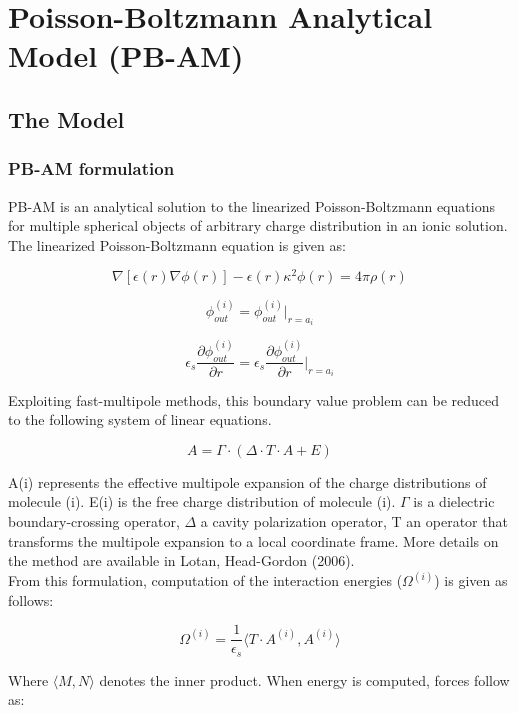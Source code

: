 
\chapter{Poisson-Boltzmann Analytical Model (PB-AM)}



\section{The Model}



\subsection{PB-AM formulation}

PB-AM is an analytical solution to the linearized Poisson-Boltzmann equations for multiple spherical objects of arbitrary charge distribution in an ionic solution.  The linearized Poisson-Boltzmann equation is given as:

\[ \nabla [\epsilon(r) \nabla\phi(r)] - \epsilon(r) \kappa^2\phi(r) = 4 \pi \rho(r) \] %

\[ \phi_{out}^{(i)}= \phi_{out}^{(i)} \biggr |_{r=a_i } \]

\[\epsilon_s \frac{\partial \phi_{out}^{(i)}}{\partial r} =   \epsilon_s \frac{\partial \phi_{out}^{(i)}}{\partial r} \biggr |_{r=a_i } \]

Exploiting fast-multipole methods, this boundary value problem can be reduced to the following system of linear equations.  

\[ A = \Gamma \cdot (\Delta \cdot T \cdot A + E) \]

A(i) represents the effective multipole expansion of the charge distributions of molecule (i). E(i) is the free charge distribution of molecule (i). $\Gamma$ is a dielectric boundary-crossing operator, $\Delta$ a cavity polarization operator, T an operator that transforms the multipole expansion to a local coordinate frame.  More details on the method are available in Lotan, Head-Gordon (2006). \\

From this formulation, computation of the interaction energies ($\Omega^{(i)}$) is given as follows:

\[\Omega^{(i)}=\frac{1}{\epsilon_s}  \langle  T \cdot A^{(i) } ,  A^{(i) } \rangle \]

Where $\langle  M, N \rangle$ denotes the inner product. When energy is computed, forces follow as:

